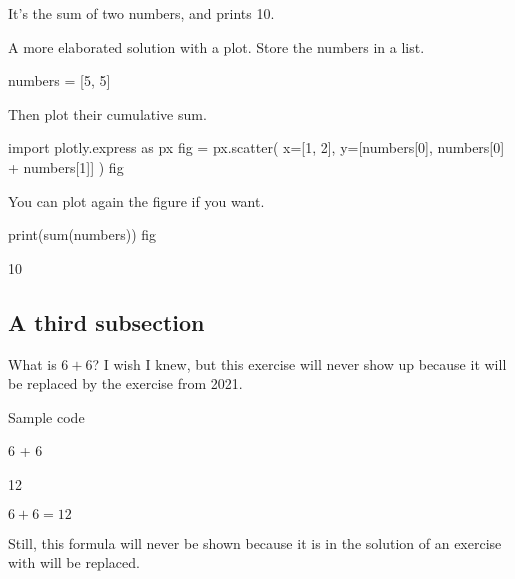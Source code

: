 \documentclass{book}
\begin{document}
\begin{solution}
It's the sum of two numbers, and prints 10.
\end{solution}

\begin{additionalinformation}
A more elaborated solution with a plot. Store the numbers in a list.

\begin{pycell}
numbers = [5, 5]
\end{pycell}

Then plot their cumulative sum.

\begin{pycell}
import plotly.express as px
fig = px.scatter(
    x=[1, 2],
    y=[numbers[0], numbers[0] + numbers[1]]
)
fig
\end{pycell}

\newpage

You can plot again the figure if you want.

\begin{pycell}
print(sum(numbers))
fig
\end{pycell}
\begin{pyexpectedoutput}
10
\end{pyexpectedoutput}
\end{additionalinformation}

\subsection{A third subsection}

\begin{exercise}[examdate={January 16, 2020}, examproblemnumber={1}, examproblemid={2020-01-16-01}, replacedbyexamproblemid={2021-01-16-01}, replacementsinceacademicyear={2025/2026}]
  What is \(6 + 6\)? I wish I knew, but this exercise will never show up because it will be replaced by the exercise from 2021.

Sample code
\begin{pycell}
6 + 6
\end{pycell}
\begin{pyexpectedoutput}
12
\end{pyexpectedoutput}
\end{exercise}

\begin{solution}
  \(6 + 6 = 12\)

Still, this formula will never be shown because it is in the solution of an exercise with will be replaced.
\end{solution}
\end{document}
